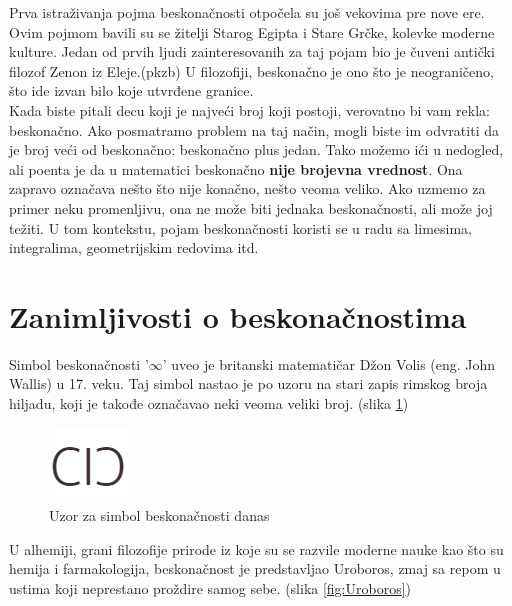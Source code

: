 \documentclass[a4paper]{article}
\begin{document}
Prva istraživanja pojma beskonačnosti otpočela su još vekovima pre nove ere. Ovim pojmom bavili su se žitelji Starog Egipta i Stare Grčke, kolevke moderne kulture. Jedan od prvih ljudi zainteresovanih za taj pojam bio je čuveni antički filozof Zenon iz Eleje.(pkzb) U filozofiji, beskonačno je ono što je neograničeno, što ide izvan bilo koje utvrđene granice\cite{weyl2013levels}.\\

Kada biste pitali decu koji je najveći broj koji postoji, verovatno bi vam rekla: beskonačno. Ako posmatramo problem na taj način, mogli biste im odvratiti da je broj veći od beskonačno: beskonačno plus jedan. Tako možemo ići u nedogled, ali poenta je da u matematici beskonačno \textbf{nije brojevna vrednost}. Ona zapravo označava nešto što nije konačno, nešto veoma veliko. Ako uzmemo za primer neku promenljivu, ona ne može biti jednaka beskonačnosti, ali može joj težiti. U tom kontekstu, pojam beskonačnosti koristi se u radu sa limesima, integralima, geometrijskim redovima itd.\\

\section{Zanimljivosti o beskonačnostima}

Simbol beskonačnosti '$\infty$' uveo je britanski matematičar Džon Volis (eng. John Wallis) u 17. veku. Taj simbol nastao je po uzoru na stari zapis rimskog broja hiljadu, koji je takođe označavao neki veoma veliki broj. (slika \ref{fig:Uzor za simbol beskonačnosti danas})\cite{beskonačno2016}
    
\begin{figure}[ht!]
\begin{center}
\includegraphics[scale=0.75]{Simbol.PNG}
\end{center}
\caption{Uzor za simbol beskonačnosti danas}
\label{fig:Uzor za simbol beskonačnosti danas}
\end{figure}
    
U alhemiji, grani filozofije prirode iz koje su se razvile moderne nauke kao što su hemija i farmakologija, beskonačnost je predstavljao Uroboros, zmaj sa repom u ustima koji neprestano proždire samog sebe. (slika \ref{fig:Uroboros})
    
\end{document}
